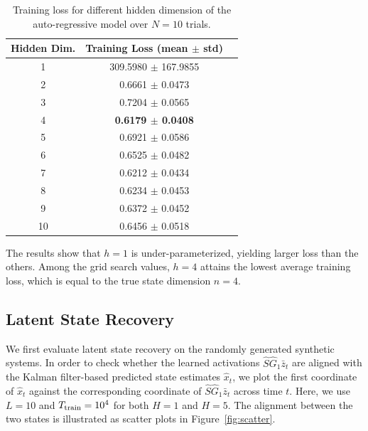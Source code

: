 \documentclass[11pt]{article}
\newcommand{\<}{\langle}
\renewcommand{\>}{\rangle}
\numberwithin{equation}{section}
\begin{document}
\begin{table}[ht]
  \caption{Training loss for different hidden dimension of the auto-regressive model over $N=10$ trials. }
  \label{table:architecture-search}
  \begin{center}
    \begin{small}
      \begin{sc}
        \begin{tabular}{ccr}
          \toprule
          Hidden Dim.  & Training Loss (mean $\pm$ std) \\
          \midrule
          1 & 309.5980 $\pm$ 167.9855 \\
          2 & 0.6661 $\pm$ 0.0473 \\
          3 & 0.7204 $\pm$ 0.0565 \\
          4 & {\bf 0.6179 $\pm$ 0.0408} \\
          5 & 0.6921 $\pm$ 0.0586 \\
          6 & 0.6525 $\pm$ 0.0482 \\
          7 & 0.6212 $\pm$ 0.0434 \\
          8 & 0.6234 $\pm$ 0.0453 \\
          9 & 0.6372 $\pm$ 0.0452 \\
          10 & 0.6456 $\pm$ 0.0518 \\
          \bottomrule
        \end{tabular}
      \end{sc}
    \end{small}
  \end{center}
  \vskip -0.1in
\end{table}

The results show that $h=1$ is under-parameterized, yielding larger loss than the others.
Among the grid search values, $h=4$ attains the lowest average training loss, which is equal to the true state dimension $n=4$.

\subsection{Latent State Recovery}



We first evaluate latent state recovery on the randomly generated synthetic systems.
In order to check whether the learned activations $\hat S \hat G_1 \bar z_t$ are aligned with the Kalman filter-based predicted state estimates $\hat x_t$, we plot the first coordinate of $\hat x_t$ against the corresponding coordinate of $\hat S \hat G_1 \bar z_t$ across time $t$. 
Here, we use $L=10$ and $T_{\rm train}=10^4$ for both $H=1$ and $H=5$. 
The alignment between the two states is illustrated as scatter plots in Figure~\ref{fig:scatter}.
\end{document}
